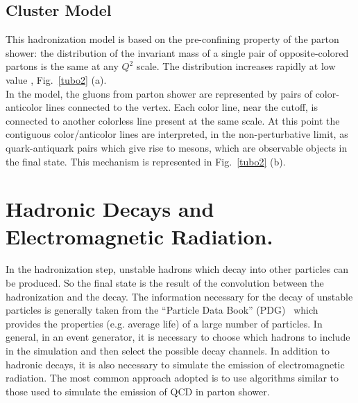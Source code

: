 \subsection*{Cluster Model}  This  hadronization model  is based on the pre-confining property of the parton shower: 
the distribution of the invariant mass of a single pair of opposite-colored partons is the same at any $ Q^2 $ scale. 
The distribution increases rapidly at low value , Fig.~\ref{tubo2} (a). \\
In the model, the gluons from parton shower are represented by pairs of color-anticolor lines connected to the vertex. Each color line, near the cutoff, is connected to another colorless line present at the same scale. At this point the contiguous color/anticolor lines are interpreted, in the non-perturbative limit, as quark-antiquark pairs which give rise to mesons, which are observable objects in the final state.
This mechanism is represented in Fig.~\ref{tubo2} (b).

\section{Hadronic Decays and  Electromagnetic   Radiation.}
In the hadronization step, unstable hadrons which decay into other particles can be produced. So the final state  is the result of the convolution between the  hadronization  and the decay. The information necessary for the decay of unstable particles  is generally taken from the  ``Particle Data Book'' (PDG)~\cite{Beringer:1900zz} which provides the properties (e.g. average life) of a large number of particles.
In general, in an event generator, it is necessary to choose which hadrons to include in the simulation and then select the possible decay channels. In addition to hadronic decays, it is also necessary to simulate the emission of electromagnetic radiation. The most common approach adopted is to use algorithms similar to those used to simulate the emission of QCD in parton shower.

